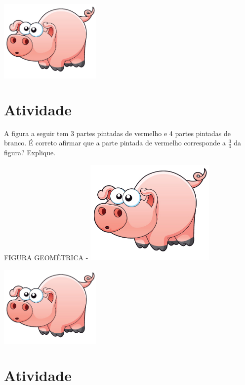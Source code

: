 \documentclass[a4,12pt]{book}
\begin{document}
\includegraphics[width=\textwidth,height=4cm, keepaspectratio]{pig}
\section{Atividade}







A figura a seguir tem 3 partes pintadas de vermelho e 4 partes pintadas de branco. É correto afirmar que a parte pintada de vermelho corresponde a $\frac{3}{4}$ da figura? Explique.
\begin{imagem*}[breakable]{}{}   FIGURA GEOMÉTRICA -   
    \includegraphics[width=180pt, keepaspectratio]{pig}  
\end{imagem*}





\includegraphics[width=\textwidth,height=4cm, keepaspectratio]{pig}
\section{Atividade}
\end{document}
